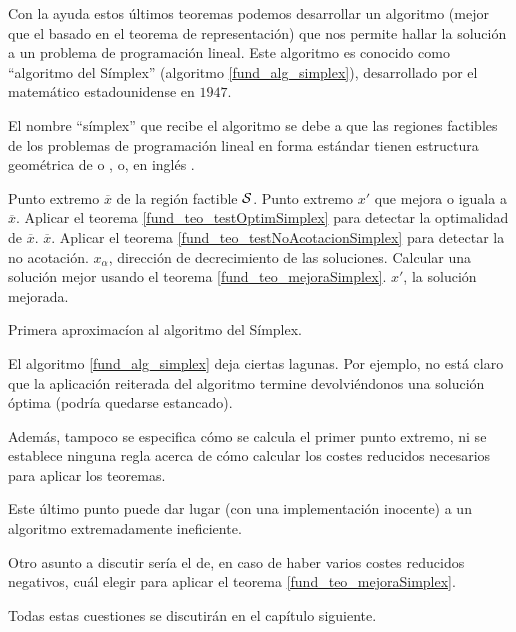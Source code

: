 Con la ayuda estos últimos teoremas podemos desarrollar un algoritmo (mejor que el basado en el teorema de representación) que nos permite hallar la solución a un problema de programación lineal. Este algoritmo es conocido como ``algoritmo del Símplex'' (algoritmo \ref{fund_alg_simplex}), desarrollado por el matemático estadounidense  en $1947$.
\begin{obs}
	El nombre ``símplex'' que recibe el algoritmo se debe a que las regiones factibles de los problemas de programación lineal en forma estándar tienen estructura geométrica de  o , o, en inglés .
\end{obs}
\begin{algorithm}[H]
	\begin{algorithmic}[1]
		\REQUIRE Punto extremo $\overline{x}$ de la región factible $\mathcal{S}$.
		\ENSURE Punto extremo $x'$ que mejora o iguala a $\overline{x}$.
		\STATE Aplicar el teorema \ref{fund_teo_testOptimSimplex} para detectar la optimalidad de $\overline{x}$.
		\RETURN $\overline{x}$.
		\ELSE 
		\STATE Aplicar el teorema \ref{fund_teo_testNoAcotacionSimplex} para detectar la no acotación.
			\RETURN $x_\alpha$, dirección de decrecimiento de las soluciones.
			\ELSE
			\STATE Calcular una solución mejor usando el teorema \ref{fund_teo_mejoraSimplex}.
			\RETURN $x'$, la solución mejorada.
			\ENDIF
		\ENDIF	
	\end{algorithmic}
	\caption{Primera aproximacíon al algoritmo del Símplex.}\label{fund_alg_simplex}
\end{algorithm}
\begin{obs}
	El algoritmo \ref{fund_alg_simplex} deja ciertas lagunas. Por ejemplo, no está claro que la aplicación reiterada del algoritmo termine devolviéndonos una solución óptima (podría quedarse estancado).
	
	Además, tampoco se especifica cómo se calcula el primer punto extremo, ni se establece ninguna regla acerca de cómo calcular los costes reducidos necesarios para aplicar los teoremas.
	
	Este último punto puede dar lugar (con una implementación inocente) a un algoritmo extremadamente ineficiente.
	
	Otro asunto a discutir sería el de, en caso de haber varios costes reducidos negativos, cuál elegir para aplicar el teorema \ref{fund_teo_mejoraSimplex}.
\end{obs}
Todas estas cuestiones se discutirán en el capítulo siguiente.